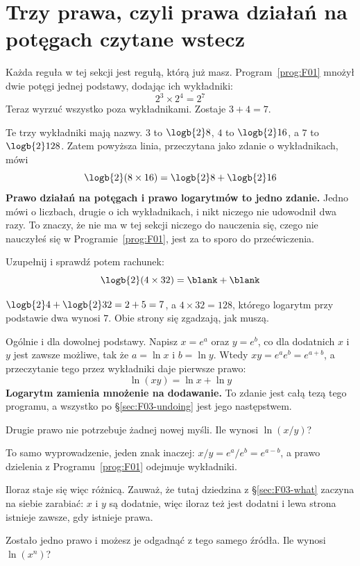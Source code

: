 \section{Trzy prawa, czyli prawa działań na potęgach czytane wstecz}
\label{sec:F03-laws}

\begin{fr}
Każda reguła w tej sekcji jest regułą, którą już masz.
Program~\ref{prog:F01} mnożył dwie potęgi jednej podstawy, dodając ich
wykładniki:
\[ 2^{3} \times 2^{4} = 2^{7} \]
Teraz wyrzuć wszystko poza wykładnikami. Zostaje $3 + 4 = 7$.

Te trzy wykładniki mają nazwy. $3$ to $\logb{2} 8$, $4$ to $\logb{2} 16$, a $7$
to $\logb{2} 128$. Zatem powyższa linia, przeczytana jako zdanie o
wykładnikach, mówi
\[ \logb{2}(8 \times 16) = \logb{2} 8 + \logb{2} 16 \]
\textbf{Prawo działań na potęgach i prawo logarytmów to jedno zdanie.} Jedno
mówi o liczbach, drugie o ich wykładnikach, i nikt niczego nie udowodnił dwa
razy. To znaczy, że nie ma w tej sekcji niczego do nauczenia się, czego nie
nauczyłeś się w Programie~\ref{prog:F01}, jest za to sporo do przećwiczenia.

Uzupełnij i sprawdź potem rachunek:
\[ \logb{2}(4 \times 32) = \blank + \blank \]
\dotline
\nextframe
\end{fr}

\begin{fr}
\begin{ansblock}
$\logb{2} 4 + \logb{2} 32 = 2 + 5 = 7$, a $4 \times 32 = 128$, którego logarytm
przy podstawie dwa wynosi $7$. Obie strony się zgadzają, jak muszą.
\end{ansblock}

Ogólnie i dla dowolnej podstawy. Napisz $x = e^{a}$ oraz $y = e^{b}$, co dla
dodatnich $x$ i $y$ jest zawsze możliwe, tak że $a = \ln x$ i $b = \ln y$.
Wtedy $xy = e^{a}e^{b} = e^{a+b}$, a przeczytanie tego przez wykładniki daje
pierwsze prawo:
\[ \ln(xy) = \ln x + \ln y \]
\textbf{Logarytm zamienia mnożenie na dodawanie.} To zdanie jest całą tezą tego
programu, a wszystko po \S\ref{sec:F03-undoing} jest jego następstwem.

Drugie prawo nie potrzebuje żadnej nowej myśli. Ile wynosi $\ln(x/y)$?
\nextframe
\end{fr}

\begin{fr}
To samo wyprowadzenie, jeden znak inaczej: $x/y = e^{a}/e^{b} = e^{a-b}$, a
prawo dzielenia z Programu~\ref{prog:F01} odejmuje wykładniki.

Iloraz staje się więc różnicą. Zauważ, że tutaj dziedzina z
\S\ref{sec:F03-what} zaczyna na siebie zarabiać: $x$ i $y$ są dodatnie, więc
iloraz też jest dodatni i lewa strona istnieje zawsze, gdy istnieje prawa.

Zostało jedno prawo i możesz je odgadnąć z tego samego źródła. Ile wynosi
$\ln(x^{n})$?
\nextframe
\end{fr}

